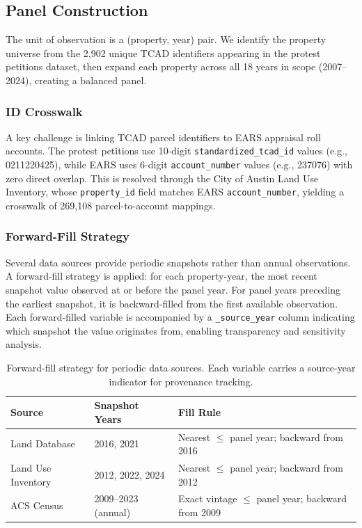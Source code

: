 \subsection{Panel Construction}

The unit of observation is a (property, year) pair.
We identify the property universe from the 2,902 unique TCAD identifiers appearing in the
protest petitions dataset, then expand each property across all 18 years in scope
(2007--2024), creating a balanced panel.

\subsubsection{ID Crosswalk}
\label{sec:crosswalk}

A key challenge is linking TCAD parcel identifiers to EARS appraisal roll accounts.
The protest petitions use 10-digit \texttt{standardized\_tcad\_id} values
(e.g., 0211220425), while EARS uses 6-digit \texttt{account\_number} values
(e.g., 237076) with zero direct overlap. This is resolved through the
City of Austin Land Use Inventory, whose \texttt{property\_id} field matches
EARS \texttt{account\_number}, yielding a crosswalk of 269,108 parcel-to-account mappings.

\subsubsection{Forward-Fill Strategy}
\label{sec:forwardfill}

Several data sources provide periodic snapshots rather than annual observations.
A forward-fill strategy is applied: for each property-year, the most recent
snapshot value observed at or before the panel year. For panel years preceding the
earliest snapshot, it is backward-filled from the first available observation.
Each forward-filled variable is accompanied by a \texttt{\_source\_year} column
indicating which snapshot the value originates from, enabling transparency and
sensitivity analysis.

\begin{table}[h]
\centering
\small
\begin{tabular}{lll}
\hline
\textbf{Source} & \textbf{Snapshot Years} & \textbf{Fill Rule} \\
\hline
Land Database & 2016, 2021 & Nearest $\leq$ panel year; backward from 2016 \\
Land Use Inventory & 2012, 2022, 2024 & Nearest $\leq$ panel year; backward from 2012 \\
ACS Census & 2009--2023 (annual) & Exact vintage $\leq$ panel year; backward from 2009 \\
\hline
\end{tabular}
\caption{Forward-fill strategy for periodic data sources. Each variable carries
a source-year indicator for provenance tracking.}
\label{tab:forwardfill}
\end{table}

